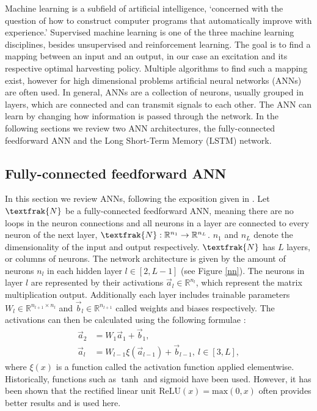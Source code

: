 Machine learning is a subfield of artificial intelligence, `concerned with the question of how to construct computer programs that automatically improve with experience.' \cite{Mitchell97}
Supervised machine learning is one of the three machine learning disciplines, besides unsupervised and reinforcement learning.
The goal is to find a mapping between an input and an output, in our case an excitation and its respective optimal harvesting policy.
Multiple algorithms to find such a mapping exist, however for high dimensional problems artificial neural networks (ANNs) are often used.
In general, ANNs are a collection of neurons, usually grouped in layers, which are connected and can transmit signals to each other.
The ANN can learn by changing how information is passed through the network.
In the following sections we review two ANN architectures, the fully-connected feedforward ANN and the Long Short-Term Memory (LSTM) network.

\subsection{Fully-connected feedforward ANN}
In this section we review ANNs, following the exposition given in \cite{lu2020dying}.
Let $\textfrak{N}$ be a fully-connected feedforward ANN, meaning there are no loops in the neuron connections and all neurons in a layer are connected to every neuron of the next layer, $\textfrak{N}: \mathbb{R}^{n_1} \to \mathbb{R}^{n_L}$. $n_1$ and $n_L$ denote the dimensionality of the input and output respectively. 
$\textfrak{N}$ has $L$ layers, or columns of neurons.
The network architecture is given by the amount of neurons $n_l$ in each hidden layer $l \in [2, L - 1]$ (see Figure \ref{nn}).
The neurons in layer $l$ are represented by their activations $\vec{a}_l \in \mathbb{R}^{n_l}$, which represent the matrix multiplication output. Additionally each layer includes trainable parameters $W_l \in \mathbb{R}^{n_{l+1} \times n_{l}}$ and $\vec{b}_l \in \mathbb{R}^{n_{l+1}}$ called weights and biases respectively.
The activations can then be calculated using the following formulae \cite{TN_libero_mab2)53517}:
\begin{align*}
	\vec{a}_2 & = W_1 \vec{a}_1 + \vec{b}_1, \\
	\vec{a}_l & = W_{l-1} \xi(\vec{a}_{l-1}) + \vec{b}_{l-1}, \ l \in [3, L],
\end{align*}
where $\xi(x)$ is a function called the activation function applied elementwise. Historically, functions such as $\tanh$ and sigmoid have been used. However, it has been shown \cite{Maas2013RectifierNI, krizhevsky} that the rectified linear unit $\mathrm{ReLU}(x) = \mathrm{max}(0, x)$ often provides better results and is used here.

